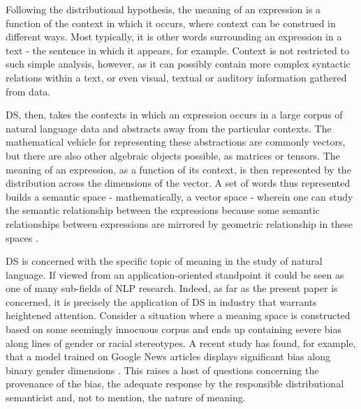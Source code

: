 \documentclass{article}
\begin{document}
Following the distributional hypothesis, the meaning of an expression is a function of the context in which it occurs, where context can be construed in different ways. Most typically, it is other words surrounding an expression in a text - the sentence in which it appears, for example. Context is not restricted to such simple analysis, however, as it can possibly contain more complex syntactic relations within a text, or even visual, textual or auditory information gathered from data.

DS, then, takes the contexts in which an expression occurs in a large corpus of natural language data and abstracts away from the particular contexts. The mathematical vehicle for representing these abstractions are commonly vectors, but there are also other algebraic objects possible, as matrices or tensors. The meaning of an expression, as a function of its context, is then represented by the distribution across the dimensions of the vector. A set of words thus represented builds a semantic space - mathematically, a vector space - wherein one can study the semantic relationship between the expressions because some semantic relationships between expressions are mirrored by geometric relationship in these spaces \cite{boleda2016formal}.

DS is concerned with the specific topic of meaning in the study of natural language. If viewed from an application-oriented standpoint it could be seen as one of many sub-fields of NLP research. Indeed, as far as the present paper is concerned, it is precisely the application of DS in industry that warrants heightened attention.
Consider a situation where a meaning space is constructed based on some seemingly innocuous corpus and ends up containing severe bias along lines of gender or racial stereotypes. A recent study has found, for example, that a model trained on Google News articles displays significant bias along binary gender dimensions \cite{bolukbasi2016man}. This raises a host of questions concerning the provenance of the bias, the adequate response by the responsible distributional semanticist and, not to mention, the nature of meaning.
\end{document}
